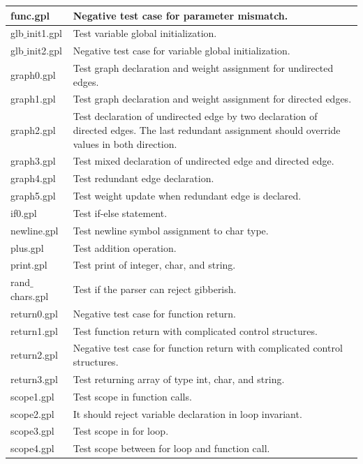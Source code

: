 \documentclass[a4paper,12pt]{article}
\begin{document}
\begin{center}
\begin{longtable}{ | p{3cm} | p{10cm} |}
    func.gpl & Negative test case for parameter mismatch. \\ \hline
    glb$\_$init1.gpl & Test variable global initialization. \\ \hline
    glb$\_$init2.gpl & Negative test case for variable global initialization. \\ \hline
    graph0.gpl &  Test graph declaration and weight assignment for undirected edges. \\ \hline
    graph1.gpl &  Test graph declaration and weight assignment for directed edges. \\ \hline
    graph2.gpl & Test declaration of undirected edge by two declaration of directed edges. The last redundant assignment should override values in both direction.  \\ \hline
    graph3.gpl & Test mixed declaration of undirected edge and directed edge. \\ \hline
    graph4.gpl & Test redundant edge declaration. \\ \hline
    graph5.gpl & Test weight update when redundant edge is declared. \\ \hline
    if0.gpl & Test if-else statement. \\ \hline
    newline.gpl & Test newline symbol assignment to char type. \\ \hline
    plus.gpl & Test addition operation. \\ \hline
    print.gpl & Test print of integer, char, and string.\\ \hline
    rand$\_$chars.gpl & Test if the parser can reject gibberish. \\ \hline
    return0.gpl & Negative test case for function return.  \\ \hline
    return1.gpl & Test function return with complicated control structures. \\ \hline
    return2.gpl & Negative test case for function return with complicated control structures. \\ \hline
    return3.gpl & Test returning array of type int, char, and string. \\ \hline
    scope1.gpl & Test scope in function calls.  \\ \hline
    scope2.gpl & It should reject variable declaration in loop invariant.  \\ \hline
    scope3.gpl & Test scope in for loop.  \\ \hline
    scope4.gpl & Test scope between for loop and function call.  \\ \hline

\end{longtable}
\end{center}
\end{document}
